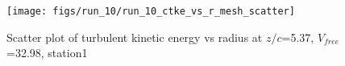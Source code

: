 \begin{figure}[H]
\centering
\texttt{[image: figs/run\_10/run\_10\_ctke\_vs\_r\_mesh\_scatter]}
\caption{Scatter plot of turbulent kinetic energy vs radius at $z/c$=5.37, $V_{free}$=32.98, station1}
\label{fig:run_10_ctke_vs_r_mesh_scatter}
\end{figure}


